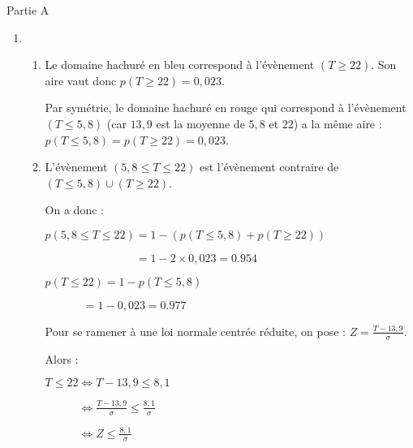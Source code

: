 \begin{corrige}
     \begin{h3}Partie A\end{h3}
     \begin{enumerate}
          \item
          \begin{enumerate}
               \item
\begin{center}
\end{center}
               Le domaine hachuré en bleu correspond à l'évènement $(T \geqslant 22)$. Son aire vaut donc $p(T \geqslant 22)=0,023$.
               \par
               Par symétrie, le domaine hachuré en rouge qui correspond à l'évènement $(T \leqslant 5,8)$ (car $13,9$ est la moyenne de $5,8$ et $22$) a la même aire : $p(T \leqslant 5,8) = p(T \geqslant 22)=0,023$.
               \item
               L'évènement $(5,8 \leqslant T \leqslant 22)$ est l'évènement contraire de $(T \leqslant 5,8) \cup(T \geqslant 22)$.
               \par
               On a donc :
               \par
               $p(5,8 \leqslant T \leqslant 22)= 1-(p(T \leqslant 5,8) + p(T \geqslant 22))$
               \par
               $\phantom{p(5,8 \leqslant T \leqslant 22)}= 1-2 \times 0,023=0.954$
               \par
               $p(T \leqslant 22)= 1-p(T \leqslant 5,8)$
               \par
               $\phantom{T \leqslant 22)} = 1- 0,023=0.977$
               \par
               Pour se ramener à une loi normale centrée réduite, on pose : $Z=\frac{T-13,9}{\sigma}$.
               \par
               Alors :
               \par
               $T \leqslant 22 \Leftrightarrow T-13,9\leqslant 8,1 $
               \par
               $\phantom{T \leqslant 22} \Leftrightarrow \frac{T-13,9}{\sigma}\leqslant \frac{8,1}{\sigma}  $
               \par
               $\phantom{T \leqslant 22} \Leftrightarrow Z\leqslant \frac{8,1}{\sigma}  $
               \par

\end{enumerate}
\end{enumerate}
\end{corrige}
